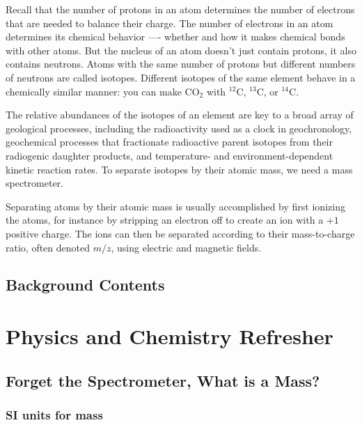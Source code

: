 \documentclass[
  letterpaper,
  DIV=11,
  numbers=noendperiod]{scrreprt}
\begin{document}
Recall that the number of protons in an atom determines the number of
electrons that are needed to balance their charge. The number of
electrons in an atom determines its chemical behavior ---- whether and
how it makes chemical bonds with other atoms. But the nucleus of an atom
doesn't just contain protons, it also contains neutrons. Atoms with the
same number of protons but different numbers of neutrons are called
isotopes. Different isotopes of the same element behave in a chemically
similar manner: you can make CO\(_{2}\) with \(^{12}\)C, \(^{13}\)C, or
\(^{14}\)C.

The relative abundances of the isotopes of an element are key to a broad
array of geological processes, including the radioactivity used as a
clock in geochronology, geochemical processes that fractionate
radioactive parent isotopes from their radiogenic daughter products, and
temperature- and environment-dependent kinetic reaction rates. To
separate isotopes by their atomic mass, we need a mass spectrometer.

Separating atoms by their atomic mass is usually accomplished by first
ionizing the atoms, for instance by stripping an electron off to create
an ion with a \(+1\) positive charge. The ions can then be separated
according to their mass-to-charge ratio, often denoted \(m/z\), using
electric and magnetic fields.

\section*{Background Contents}\label{background-contents}


\label{overview-listing}

\chapter{Physics and Chemistry
Refresher}\label{physics-and-chemistry-refresher}

\section{Forget the Spectrometer, What is a
Mass?}\label{forget-the-spectrometer-what-is-a-mass}

\subsection{SI units for mass}\label{si-units-for-mass}
\end{document}
